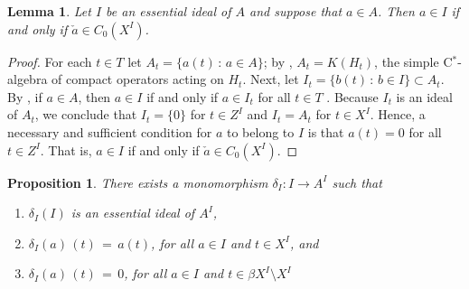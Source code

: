 \documentclass{amsart}
\newtheorem{lemma}[theorem]{Lemma}
\newtheorem{proposition}[theorem]{Proposition}
\theoremstyle{definition}
\theoremstyle{remark}
\begin{document}
\begin{lemma}\label{ess ideal mem} Let $I$ be an
essential ideal of $A$ and
suppose that $a\in A$. Then $a\in I$ if and only if $\check{a}\in C_0(X^I)$.
\end{lemma}

\begin{proof} For each $t\in T$ let $A_t=\{a(t)\,:\,a\in A\}$; by \cite[Theorem 4.4]{fell1961},
$A_t=K(H_t)$, the simple C$^*$-algebra of compact operators acting on $H_t$. Next,
let $I_t=\{b(t)\,:\,b\in I\}\subset A_t$. By \cite[Lemma 1.8]{fell1961}, if
$a\in A$, then  $a\in I$ if and only if $a\in I_t$ for all $t\in T$ . Because $I_t$ is an ideal of $A_t$,
we conclude that
$I_t=\{0\}$ for $t\in Z^I$
and $I_t=A_t$ for $t\in X^I$.
Hence, a necessary and sufficient condition for $a$ to belong to $I$ is that
$a(t)=0$ for all $t\in Z^I$. That is,
$a\in I$ if and only if $\check{a}\in C_0(X^I)$.
\end{proof}

\begin{proposition}\label{essen emb} There exists a monomorphism $\delta_I:I\rightarrow A^I$ such that
\begin{enumerate}
\item $\delta_I(I)$ is an essential ideal of $A^I$,
\item $\delta_I(a)\,(t)\,=\,a(t)$, for all $a\in I$ and $t\in X^I$, and
\item $\delta_I(a)\,(t)\,=\,0$, for all $a\in I$ and $t\in \beta X^I\setminus X^I$
\end{enumerate}
\end{proposition}
\end{document}
